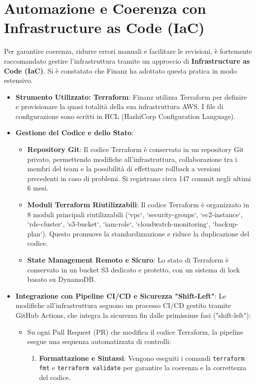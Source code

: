 \section{Automazione e Coerenza con Infrastructure as Code (IaC)}
\label{sec:iac_cap2}
Per garantire coerenza, ridurre errori manuali e facilitare le revisioni, è fortemente raccomandato gestire l'infrastruttura tramite un approccio di \textbf{Infrastructure as Code (IaC)}. Si è constatato che Finanz ha adottato questa pratica in modo estensivo.
\begin{itemize}
    \item \textbf{Strumento Utilizzato: Terraform}: Finanz utilizza Terraform per definire e provisionare la quasi totalità della sua infrastruttura AWS. I file di configurazione sono scritti in HCL (HashiCorp Configuration Language).
    \item \textbf{Gestione del Codice e dello Stato}:
    \begin{itemize}
        \item \textbf{Repository Git}: Il codice Terraform è conservato in un repository Git privato, permettendo modifiche all'infrastruttura, collaborazione tra i membri del team e la possibilità di effettuare rollback a versioni precedenti in caso di problemi. Si registrano circa 147 commit negli ultimi 6 mesi.
        \item \textbf{Moduli Terraform Riutilizzabili}: Il codice Terraform è organizzato in 8 moduli principali riutilizzabili (`vpc`, `security-groups`, `ec2-instance`, `rds-cluster`, `s3-bucket`, `iam-role`, `cloudwatch-monitoring`, `backup-plan`). Questo promuove la standardizzazione e riduce la duplicazione del codice.
        \item \textbf{State Management Remoto e Sicuro}: Lo stato di Terraform è conservato in un bucket S3 dedicato e protetto, con un sistema di lock basato su DynamoDB.
    \end{itemize}
    \item \textbf{Integrazione con Pipeline CI/CD e Sicurezza "Shift-Left"}: Le modifiche all'infrastruttura seguono un processo CI/CD gestito tramite GitHub Actions, che integra la sicurezza fin dalle primissime fasi ("shift-left"):
        \begin{itemize}
        \item Su ogni Pull Request (PR) che modifica il codice Terraform, la pipeline esegue una sequenza automatizzata di controlli:
        \begin{enumerate}
        \item \textbf{Formattazione e Sintassi}: Vengono eseguiti i comandi \texttt{terraform fmt} e \texttt{terraform validate} per garantire la coerenza e la correttezza del codice.

\end{enumerate}
\end{itemize}
\end{itemize}
